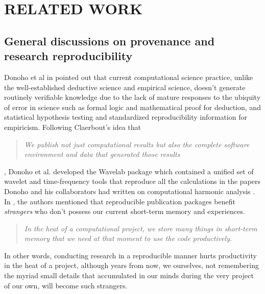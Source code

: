 
\chapter{RELATED WORK}
\label{related-work}

\section{General discussions on provenance and research reproducibility}
\label{sec:reproducibility}

Donoho et al in \cite{donoho2009reproducible} pointed out that current computational science practice, unlike the well-established deductive science and empirical science, doesn't generate routinely verifiable knowledge due to the lack of mature responses to the ubiquity of error in science such as formal logic and mathematical proof for deduction, and statistical hypothesis testing and standardized reproducibility information for empiricism. Following Claerbout's idea that
\begin{quote}\emph{
	We publish not just computational results
	but also the complete software environment
	and data that generated those results
}
\end{quote}
, Donoho et al. developed the Wavelab package which contained a unified set of wavelet and time-frequency tools that reproduce all the calculations in the papers Donoho and his collaborators had written on computational harmonic analysis \cite{buckheit1995wavelab}. In \cite{donoho2009reproducible}, the authors mentioned that reproducible publication packages benefit \emph{strangers} who don't possess our current short-term memory and experiences.
\begin{quote}\emph{
	In the heat
	of a computational project, we store many things
	in short-term memory that we need at that moment
	to use the code productively.}
\end{quote}
In other words, conducting research in a reproducible manner hurts productivity in the heat of a project, although years from now, we ourselves, not remembering the myriad small details that accumulated in our minds during the very project of our own, will become such strangers.

